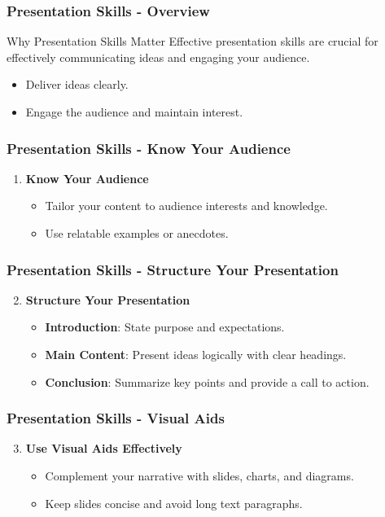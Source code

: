 \documentclass[aspectratio=169]{beamer}
\begin{document}
\begin{frame}[fragile]
    \frametitle{Presentation Skills - Overview}
    \begin{block}{Why Presentation Skills Matter}
        Effective presentation skills are crucial for effectively communicating ideas and engaging your audience.
    \end{block}
    \begin{itemize}
        \item Deliver ideas clearly.
        \item Engage the audience and maintain interest.
    \end{itemize}
\end{frame}

\begin{frame}[fragile]
    \frametitle{Presentation Skills - Know Your Audience}
    \begin{enumerate}
        \item \textbf{Know Your Audience}
        \begin{itemize}
            \item Tailor your content to audience interests and knowledge.
            \item Use relatable examples or anecdotes.
        \end{itemize}
    \end{enumerate}
\end{frame}

\begin{frame}[fragile]
    \frametitle{Presentation Skills - Structure Your Presentation}
    \begin{enumerate}
        \setcounter{enumi}{1}
        \item \textbf{Structure Your Presentation}
        \begin{itemize}
            \item \textbf{Introduction}: State purpose and expectations.
            \item \textbf{Main Content}: Present ideas logically with clear headings.
            \item \textbf{Conclusion}: Summarize key points and provide a call to action.
        \end{itemize}
    \end{enumerate}
\end{frame}

\begin{frame}[fragile]
    \frametitle{Presentation Skills - Visual Aids}
    \begin{enumerate}
        \setcounter{enumi}{2}
        \item \textbf{Use Visual Aids Effectively}
        \begin{itemize}
            \item Complement your narrative with slides, charts, and diagrams.
            \item Keep slides concise and avoid long text paragraphs.
        \end{itemize}
    \end{enumerate}
\end{frame}
\end{document}
